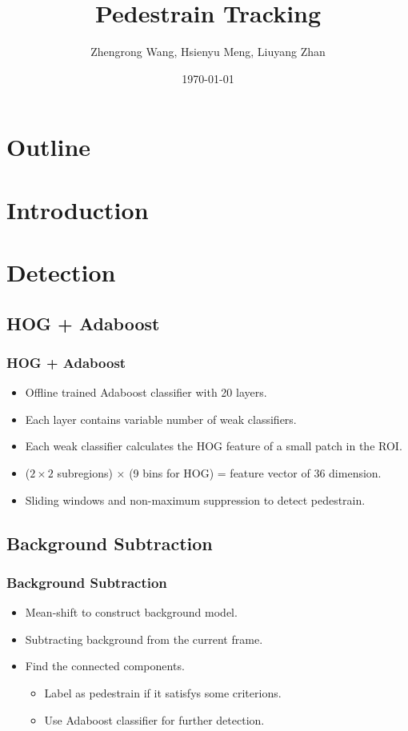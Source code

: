 \documentclass{beamer}
\title{Pedestrain Tracking}
\author{Zhengrong Wang, Hsienyu Meng, Liuyang Zhan}
\date{\today}
\begin{document}
\begin{frame}
\titlepage
\end{frame}

\section*{Outline}
\begin{frame}
\tableofcontents
\end{frame}

\section{Introduction}

\section{Detection}
\subsection{HOG + Adaboost}
\begin{frame}
\frametitle{HOG + Adaboost}
\begin{itemize}
\item Offline trained Adaboost classifier with 20 layers.
\item Each layer contains variable number of weak classifiers.
\item Each weak classifier calculates the HOG feature of a small patch in the ROI.
\item ($2\times2$ subregions) $\times$ (9 bins for HOG) = feature vector of 36 dimension.
\item Sliding windows and non-maximum suppression to detect pedestrain.
\end{itemize}
\end{frame}

\subsection{Background Subtraction}
\begin{frame}
\frametitle{Background Subtraction}
\begin{itemize}
\item Mean-shift to construct background model.
\item Subtracting background from the current frame.
\item Find the connected components.
\begin{itemize}
	\item Label as pedestrain if it satisfys some criterions.
	\item Use Adaboost classifier for further detection.

\end{itemize}
\end{itemize}
\end{frame}
\end{document}

